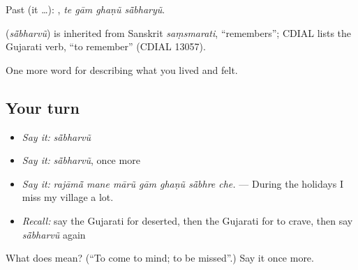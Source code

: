 Past (it …):    , \emph{te gām ghaṇũ sā̃bharyũ}.

\begin{cousinweb}
\textbf{} (\emph{sā̃bharvũ}) is inherited from Sanskrit \emph{saṃsmarati}, \textquotedblleft{}remembers\textquotedblright{}; CDIAL lists the Gujarati verb, \textquotedblleft{}to remember\textquotedblright{} (CDIAL 13057).
\end{cousinweb}

\begin{grammarlens}[title={What you've built}]
One more word for describing what you lived and felt.
\end{grammarlens}

\subsection*{Your turn}
\begin{itemize}
\raggedright
  \item \emph{Say it:} \emph{sā̃bharvũ}
  \item \emph{Say it:} \emph{sā̃bharvũ}, once more
  \item \emph{Say it:} \emph{rajāmā̃ mane mārũ gām ghaṇũ sā̃bhre che.} — During the holidays I miss my village a lot.
  \item \emph{Recall:} say the Gujarati for deserted, then the Gujarati for to crave, then say \emph{sā̃bharvũ} again
\end{itemize}

\begin{tcolorbox}[breakable,colback=teal!4,colframe=teal!35!black,title={Before you move on}]
What does  mean? (\textquotedblleft{}To come to mind; to be missed\textquotedblright{}.) Say it once more.
\end{tcolorbox}
